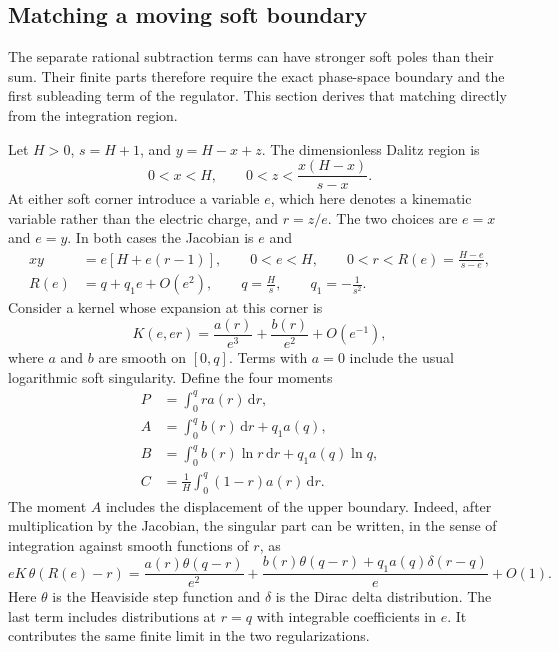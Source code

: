 \subsection{Matching a moving soft boundary}
\label{sec:compton-soft-matching-check}

The separate rational subtraction terms can have stronger soft poles than
 their sum.  Their finite parts therefore require the exact phase-space
boundary and the first subleading term of the regulator.  This section derives
that matching directly from the integration region.

Let $H>0$, $s=H+1$, and $y=H-x+z$.  The dimensionless Dalitz region is
\begin{equation}
 0<x<H,\qquad 0<z<\frac{x(H-x)}{s-x}.
\end{equation}
At either soft corner introduce a variable $e$, which here denotes a
kinematic variable rather than the electric charge, and $r=z/e$.  The two
choices are $e=x$ and $e=y$.  In both cases the Jacobian is $e$ and
\begin{align}
 xy&=e[H+e(r-1)],\qquad
 0<e<H,\qquad 0<r<R(e)=\frac{H-e}{s-e},\\
 R(e)&=q+q_1e+O(e^2),\qquad
 q=\frac{H}{s},\qquad q_1=-\frac{1}{s^2}.
\end{align}
Consider a kernel whose expansion at this corner is
\begin{equation}
 K(e,er)=\frac{a(r)}{e^3}+\frac{b(r)}{e^2}+O(e^{-1}),
 \label{eq:compton-matching-kernel}
\end{equation}
where $a$ and $b$ are smooth on $[0,q]$.  Terms with $a=0$ include the usual
logarithmic soft singularity.  Define the four moments
\begin{align}
 P&=\int_0^q r a(r)\,\mathrm{d}r,\\
 A&=\int_0^q b(r)\,\mathrm{d}r+q_1a(q),\\
 B&=\int_0^q b(r)\ln r\,\mathrm{d}r+q_1a(q)\ln q,\\
 C&=\frac{1}{H}\int_0^q(1-r)a(r)\,\mathrm{d}r.
\end{align}
The moment $A$ includes the displacement of the upper boundary.  Indeed,
after multiplication by the Jacobian, the singular part can be written,
in the sense of integration against smooth functions of $r$, as
\begin{equation}
 eK\,\theta(R(e)-r)
 =\frac{a(r)\theta(q-r)}{e^2}
 +\frac{b(r)\theta(q-r)+q_1a(q)\delta(r-q)}{e}
 +O(1).
 \label{eq:compton-moving-boundary-distribution}
\end{equation}
Here $\theta$ is the Heaviside step function and $\delta$ is the
Dirac delta distribution. The last term includes distributions at $r=q$ with integrable coefficients
in $e$.  It contributes the same finite limit in the two regularizations.

